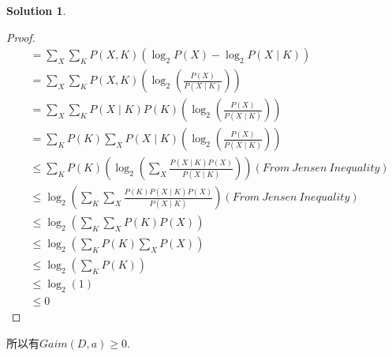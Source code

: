 \documentclass[a4paper,UTF8]{article}
\theoremstyle{definition}
\newtheorem*{solution}{Solution}
\begin{document}
\begin{solution}
\begin{enumerate}
\begin{proof}
\begin{align*}
				                 & = \sum_{X} \sum_{K} P(X, K)\left(\log _{2} P(X)-\log _{2} P(X \mid K)\right)                                                 \\
				                 & = \sum_{X} \sum_{K} P(X, K)\left(\log _{2}\left(\frac{P(X)}{P(X \mid K)}\right)\right)                                       \\
				                 & = \sum_{X} \sum_{K} P(X \mid K) P(K)\left(\log _{2}\left(\frac{P(X)}{P(X \mid K)}\right)\right)                              \\
				                 & = \sum_{K} P(K) \sum_{X} P(X \mid K)\left(\log _{2}\left(\frac{P(X)}{P(X \mid K)}\right)\right)                              \\
				                 & \leq \sum_{K} P(K)\left(\log _{2}\left(\sum_{X} \frac{P(X \mid K) P(X)}{P(X \mid K)}\right)\right)(From\ Jensen\ Inequality) \\
				                 & \leq \log _{2}\left(\sum_{K} \sum_{X} \frac{P(K) P(X \mid K) P(X)}{P(X \mid K)}\right) (From\ Jensen\ Inequality)            \\
				                 & \leq \log _{2}\left(\sum_{K} \sum_{X} P(K) P(X)\right)                                                                       \\
				                 & \leq \log _{2}\left(\sum_{K} P(K) \sum_{X} P(X)\right)                                                                       \\
				                 & \leq \log _{2}\left(\sum_{K} P(K)\right)                                                                                     \\
				                 & \leq \log _{2}(1)                                                                                                            \\
				                 & \leq 0
			      \end{align*}
		      \end{proof}
		      所以有$Gaim(D,a)\geqslant 0$.
	\end{enumerate}
\end{solution}
\end{document}
